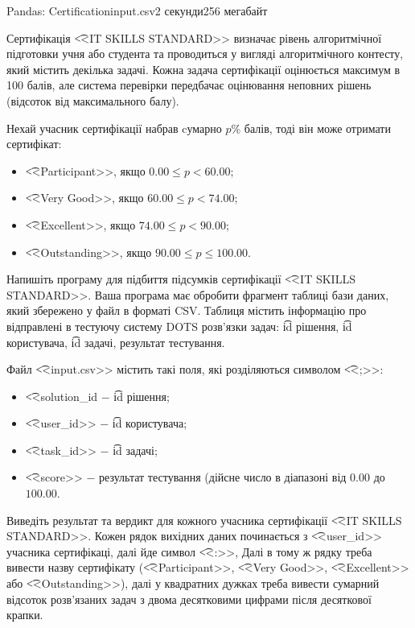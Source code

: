 \begin{problem}{Pandas: Certification}{input.csv}{}{2 секунди}{256 мегабайт}

Сертифікація \t{<<IT SKILLS STANDARD>>} визначає рівень алгоритмічної підготовки учня або студента 
та проводиться у вигляді алгоритмічного контесту, який містить декілька задачі. 
Кожна задача сертифікації оцінюється максимум в 100 балів, але система перевірки
передбачає оцінювання неповних рішень (відсоток від максимального балу).

Нехай учасник сертифікації набрав cумарно $p$\% балів, тоді він може отримати сертифікат: 
\begin{itemize}
  \item \t{<<Participant>>}, якщо $0.00 \le p < 60.00$; 
  \item \t{<<Very Good>>}, якщо $60.00 \le p < 74.00$; 
  \item \t{<<Excellent>>}, якщо $74.00 \le p < 90.00$;
  \item \t{<<Outstanding>>}, якщо $90.00 \le p \le 100.00$.
\end{itemize}

Напишіть програму для підбиття підсумків сертифікації \t{<<IT SKILLS STANDARD>>}.
Ваша програма має обробити фрагмент таблиці бази даних, який збережено у файл в форматі CSV.
Таблиця містить інформацію про відправлені в тестуючу систему DOTS розв'язки задач: 
\t{id} рішення, \t{id} користувача, \t{id} задачі, результат тестування.

\InputFile
Файл \t{<<input.csv>>} містить такі поля, які розділяються символом \t{<<;>>}:
\begin{itemize}
  \item \t{<<solution\_id} $-$ \t{id} рішення;
  \item \t{<<user\_id>>} $-$ \t{id} користувача;
  \item \t{<<task\_id>>} $-$ \t{id} задачі;
  \item \t{<<score>>} $-$ результат тестування (дійсне число в діапазоні від $0.00$ до $100.00$. 
\end{itemize}

\OutputFile
Виведіть результат та вердикт для кожного учасника сертифікації \t{<<IT SKILLS STANDARD>>}.
Кожен рядок вихідних даних починається з \t{<<user\_id>>} учасника сертифікаці, далі йде символ \t{<<:>>}, 
Далі в тому ж рядку треба вивести назву сертифікату (\t{<<Participant>>}, \t{<<Very Good>>},
\t{<<Excellent>>} або \t{<<Outstanding>>}), далі у квадратних дужках треба вивести сумарний відсоток
розв'язаних задач з двома десятковими цифрами після десяткової крапки.

\Example
\begin{example}
%
\end{example}

\end{problem}

